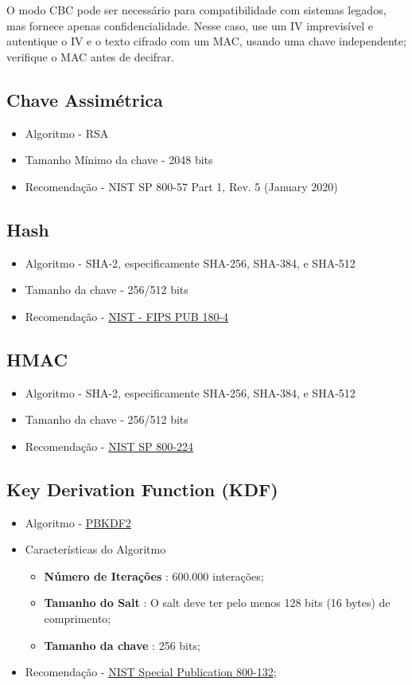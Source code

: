 \documentclass[12pt]{article}
\begin{document}
O modo CBC pode ser necessário para compatibilidade com sistemas legados, mas fornece apenas confidencialidade. Nesse caso, use um IV imprevisível e autentique o IV e o texto cifrado com um MAC, usando uma chave independente; verifique o MAC antes de decifrar.

\subsection{Chave Assimétrica}
	\begin{itemize}
		\item Algoritmo - RSA
		\item Tamanho Mínimo da chave - 2048 bits
		\item Recomendação - NIST SP 800-57 Part 1, Rev. 5 (January 2020)
	\end{itemize}

\subsection{Hash}
	\begin{itemize}
		\item Algoritmo - SHA-2, especificamente SHA-256, SHA-384, e SHA-512
		\item Tamanho da chave - 256/512 bits
		\item Recomendação - \href{https://nvlpubs.nist.gov/nistpubs/FIPS/NIST.FIPS.180-4.pdf}{NIST - FIPS PUB 180-4}
	\end{itemize}

\subsection{HMAC}
	\begin{itemize}
		\item Algoritmo - SHA-2, especificamente SHA-256, SHA-384, e SHA-512
		\item Tamanho da chave - 256/512 bits
		\item Recomendação - \href{https://csrc.nist.gov/pubs/sp/800/224/ipd}{NIST SP 800-224}
	\end{itemize}

\subsection{Key Derivation Function (KDF)}
	\begin{itemize}
		\item Algoritmo -  \href{https://www.rfc-editor.org/rfc/rfc8018.html}{PBKDF2}
		\item Características do Algoritmo
		\begin{itemize}
			\item \textbf{Número de Iterações} : 600.000 interações;
			\item \textbf{Tamanho do Salt} : O salt deve ter pelo menos 128 bits (16 bytes) de comprimento;
			\item \textbf{Tamanho da chave} : 256 bits;
		\end{itemize}
		\item Recomendação - \href{https://csrc.nist.gov/publications/detail/sp/800-132/final}{NIST Special Publication 800-132};
	\end{itemize}
\end{document}
